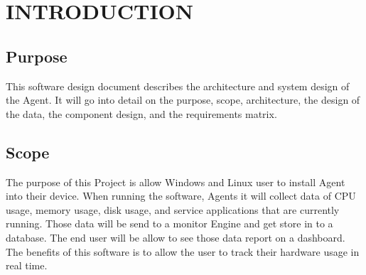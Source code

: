 \documentclass[letterpaper,12pt,oneside,listof=totoc]{scrreprt}
\begin{document}
%
%
%

\chapter{INTRODUCTION}

\section{Purpose}
This software design document describes the architecture and system design of the Agent. It will go into detail on the purpose, scope, architecture, the design of the data, the component design, and the requirements matrix.

\section{Scope}
The purpose of this Project is allow Windows and Linux user to install Agent into their device. When running the software, Agents it will collect data of CPU usage, memory usage, disk usage, and service applications that are currently running. Those data will be send to a monitor Engine and get store in to a database. The end user will be allow to see those data report on a dashboard. The benefits of this software is to allow the user to track their hardware usage in real time. 
\end{document}
